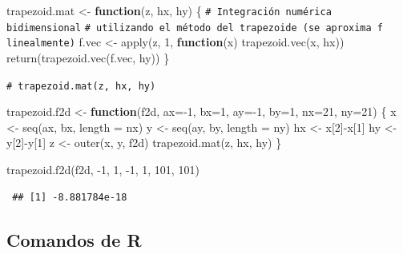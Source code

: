 \documentclass[
]{book}
\newenvironment{Shaded}{\begin{snugshade}}{\end{snugshade}}
\newcommand{\AttributeTok}[1]{\textcolor[rgb]{0.77,0.63,0.00}{#1}}
\newcommand{\CommentTok}[1]{\textcolor[rgb]{0.56,0.35,0.01}{\textit{#1}}}
\newcommand{\ControlFlowTok}[1]{\textcolor[rgb]{0.13,0.29,0.53}{\textbf{#1}}}
\newcommand{\DecValTok}[1]{\textcolor[rgb]{0.00,0.00,0.81}{#1}}
\newcommand{\FunctionTok}[1]{\textcolor[rgb]{0.00,0.00,0.00}{#1}}
\newcommand{\NormalTok}[1]{#1}
\newcommand{\OtherTok}[1]{\textcolor[rgb]{0.56,0.35,0.01}{#1}}
\newcommand{\SpecialCharTok}[1]{\textcolor[rgb]{0.00,0.00,0.00}{#1}}
\theoremstyle{break}
\theoremstyle{nonumberplain}
\renewcommand{\CommentTok}[1]{\textcolor[rgb]{0.41,0.41,0.41}{\texttt{#1}}}
\begin{document}
\begin{Shaded}
\begin{Highlighting}[]
\NormalTok{trapezoid.mat }\OtherTok{\textless{}{-}} \ControlFlowTok{function}\NormalTok{(z, hx, hy) \{ }
\CommentTok{\# Integración numérica bidimensional}
\CommentTok{\# utilizando el método del trapezoide (se aproxima f linealmente)}
\NormalTok{  f.vec }\OtherTok{\textless{}{-}} \FunctionTok{apply}\NormalTok{(z, }\DecValTok{1}\NormalTok{, }\ControlFlowTok{function}\NormalTok{(x) }\FunctionTok{trapezoid.vec}\NormalTok{(x, hx))}
  \FunctionTok{return}\NormalTok{(}\FunctionTok{trapezoid.vec}\NormalTok{(f.vec, hy)) }
\NormalTok{\}}

\CommentTok{\# trapezoid.mat(z, hx, hy) }

\NormalTok{trapezoid.f2d }\OtherTok{\textless{}{-}} \ControlFlowTok{function}\NormalTok{(f2d, }\AttributeTok{ax=}\SpecialCharTok{{-}}\DecValTok{1}\NormalTok{, }\AttributeTok{bx=}\DecValTok{1}\NormalTok{, }\AttributeTok{ay=}\SpecialCharTok{{-}}\DecValTok{1}\NormalTok{, }\AttributeTok{by=}\DecValTok{1}\NormalTok{, }\AttributeTok{nx=}\DecValTok{21}\NormalTok{, }\AttributeTok{ny=}\DecValTok{21}\NormalTok{) \{ }
\NormalTok{  x }\OtherTok{\textless{}{-}} \FunctionTok{seq}\NormalTok{(ax, bx, }\AttributeTok{length =}\NormalTok{ nx)}
\NormalTok{  y }\OtherTok{\textless{}{-}} \FunctionTok{seq}\NormalTok{(ay, by, }\AttributeTok{length =}\NormalTok{ ny)}
\NormalTok{  hx }\OtherTok{\textless{}{-}}\NormalTok{ x[}\DecValTok{2}\NormalTok{]}\SpecialCharTok{{-}}\NormalTok{x[}\DecValTok{1}\NormalTok{]}
\NormalTok{  hy }\OtherTok{\textless{}{-}}\NormalTok{ y[}\DecValTok{2}\NormalTok{]}\SpecialCharTok{{-}}\NormalTok{y[}\DecValTok{1}\NormalTok{]}
\NormalTok{  z }\OtherTok{\textless{}{-}} \FunctionTok{outer}\NormalTok{(x, y, f2d)}
  \FunctionTok{trapezoid.mat}\NormalTok{(z, hx, hy)}
\NormalTok{\}}

\FunctionTok{trapezoid.f2d}\NormalTok{(f2d, }\SpecialCharTok{{-}}\DecValTok{1}\NormalTok{, }\DecValTok{1}\NormalTok{, }\SpecialCharTok{{-}}\DecValTok{1}\NormalTok{, }\DecValTok{1}\NormalTok{, }\DecValTok{101}\NormalTok{, }\DecValTok{101}\NormalTok{) }
\end{Highlighting}
\end{Shaded}

\begin{verbatim}
 ## [1] -8.881784e-18
\end{verbatim}

\hypertarget{comandos-de-r-1}{%
\subsection{Comandos de R}\label{comandos-de-r-1}}
\end{document}

